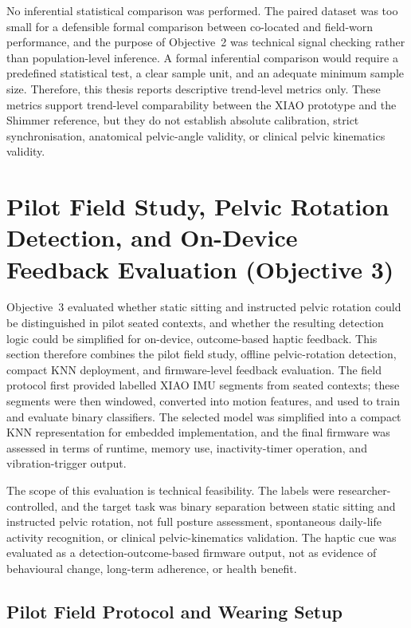 No inferential statistical comparison was performed. The paired dataset was too small for a defensible formal comparison between co-located and field-worn performance, and the purpose of Objective~2 was technical signal checking rather than population-level inference. A formal inferential comparison would require a predefined statistical test, a clear sample unit, and an adequate minimum sample size. Therefore, this thesis reports descriptive trend-level metrics only. These metrics support trend-level comparability between the XIAO prototype and the Shimmer reference, but they do not establish absolute calibration, strict synchronisation, anatomical pelvic-angle validity, or clinical pelvic kinematics validity.

\section{Pilot Field Study, Pelvic Rotation Detection, and On-Device Feedback Evaluation (Objective 3)}

Objective~3 evaluated whether static sitting and instructed pelvic rotation could be distinguished in pilot seated contexts, and whether the resulting detection logic could be simplified for on-device, outcome-based haptic feedback. This section therefore combines the pilot field study, offline pelvic-rotation detection, compact KNN deployment, and firmware-level feedback evaluation. The field protocol first provided labelled XIAO IMU segments from seated contexts; these segments were then windowed, converted into motion features, and used to train and evaluate binary classifiers. The selected model was simplified into a compact KNN representation for embedded implementation, and the final firmware was assessed in terms of runtime, memory use, inactivity-timer operation, and vibration-trigger output.

The scope of this evaluation is technical feasibility. The labels were researcher-controlled, and the target task was binary separation between static sitting and instructed pelvic rotation, not full posture assessment, spontaneous daily-life activity recognition, or clinical pelvic-kinematics validation. The haptic cue was evaluated as a detection-outcome-based firmware output, not as evidence of behavioural change, long-term adherence, or health benefit.

\subsection{Pilot Field Protocol and Wearing Setup}\label{sec:pilot_field_protocol}

